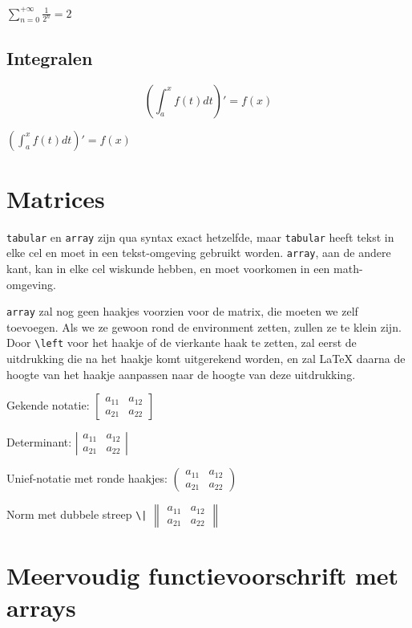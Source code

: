 \documentclass{article}
\begin{document}
	 \(\sum_{n=0}^{+\infty}\frac{1}{2^n} = 2\)
	 
	 \subsection{Integralen}
	 
	 \[ \left(\int_a^x f(t)dt\right)' = f(x) \]
	 
	 \((\int_a^x f(t)dt)' = f(x)\)
	 
	 \section{Matrices}
	 
	 \texttt{tabular} en \texttt{array} zijn qua syntax exact hetzelfde, maar \texttt{tabular} heeft tekst in elke cel en moet in een tekst-omgeving gebruikt worden. \texttt{array}, aan de andere kant, kan in elke cel wiskunde hebben, en moet voorkomen in een math-omgeving.
	 
	\texttt{array} zal nog geen haakjes voorzien voor de matrix, die moeten we zelf toevoegen. Als we ze gewoon rond de environment zetten, zullen ze te klein zijn. Door \verb*|\left| voor het haakje of de vierkante haak te zetten, zal eerst de uitdrukking die na het haakje komt uitgerekend worden, en zal \LaTeX{} daarna de hoogte van het haakje aanpassen naar de hoogte van deze uitdrukking.
	 
	 Gekende notatie:
	 \( \left[ \begin{array}{ll}
	 	a_{11} & a_{12} \\
	 	a_{21} & a_{22}
	 \end{array} \right]\)
	 
	 Determinant:
	\( \left| \begin{array}{ll}
	 	a_{11} & a_{12} \\
	 	a_{21} & a_{22}
	 \end{array} \right|\)
	 
	 Unief-notatie met ronde haakjes:
	 \(\left(\begin{array}{ll}
	 	a_{11} & a_{12} \\
	 	a_{21} & a_{22}
	 \end{array} \right)\)
	 
	 Norm met dubbele streep \verb?\|?
	 	\( \left\| \begin{array}{ll}
	 	a_{11} & a_{12} \\
	 	a_{21} & a_{22}
	 \end{array} \right\| \)
	 
	 \section{Meervoudig functievoorschrift met arrays}
	 
\end{document}
